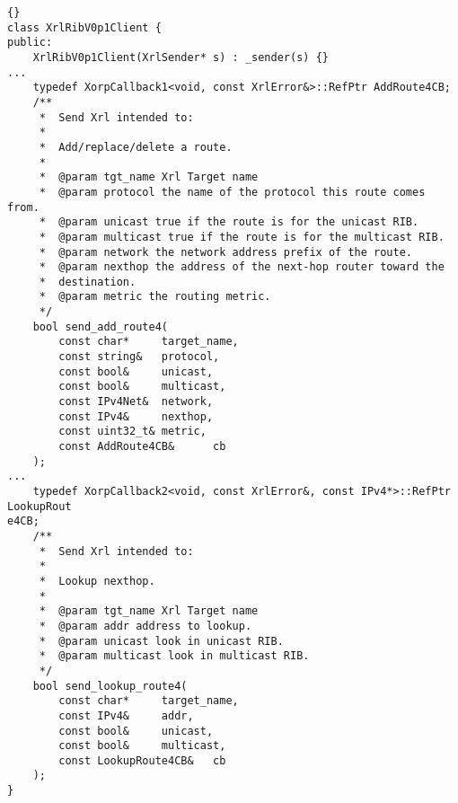 \documentclass[11pt]{article}
\newcommand{\stt}{\tt\small}
\begin{document}
\begin{lstlisting}[caption={Extracts from {\stt xorp/xrl/interfaces/rib\_xif.hh} %
                                     \label{lst:ribxif.hh} } ]{}
class XrlRibV0p1Client {
public:
    XrlRibV0p1Client(XrlSender* s) : _sender(s) {}
...
    typedef XorpCallback1<void, const XrlError&>::RefPtr AddRoute4CB;
    /**
     *  Send Xrl intended to:
     *
     *  Add/replace/delete a route.
     *
     *  @param tgt_name Xrl Target name
     *  @param protocol the name of the protocol this route comes from.
     *  @param unicast true if the route is for the unicast RIB.
     *  @param multicast true if the route is for the multicast RIB.
     *  @param network the network address prefix of the route.
     *  @param nexthop the address of the next-hop router toward the
     *  destination.
     *  @param metric the routing metric.
     */
    bool send_add_route4(
        const char*     target_name,
        const string&   protocol,
        const bool&     unicast,
        const bool&     multicast,
        const IPv4Net&  network,
        const IPv4&     nexthop,
        const uint32_t& metric,
        const AddRoute4CB&      cb
    );
...
    typedef XorpCallback2<void, const XrlError&, const IPv4*>::RefPtr LookupRout
e4CB;
    /**
     *  Send Xrl intended to:
     *
     *  Lookup nexthop.
     *
     *  @param tgt_name Xrl Target name
     *  @param addr address to lookup.
     *  @param unicast look in unicast RIB.
     *  @param multicast look in multicast RIB.
     */
    bool send_lookup_route4(
        const char*     target_name,
        const IPv4&     addr,
        const bool&     unicast,
        const bool&     multicast,
        const LookupRoute4CB&   cb
    );
}
\end{lstlisting}
\newpage
\end{document}
